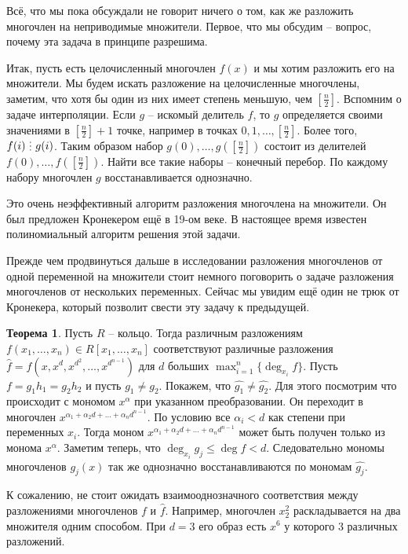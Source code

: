 \documentclass[10pt,a4paper,oneside]{book}
\theoremstyle{definition}
\newtheorem{thm}{{\color{red!40!black} Теорема}}
\newcommand{\di}{\mathop{\,\scalebox{0.85}{\raisebox{-1.2pt}[0.5\height]{\vdots}}\,}}
\def\thrm{\begin{thm}}
\def\ethrm{\end{thm}}
\begin{document}
Всё, что мы пока обсуждали не говорит ничего о том, как же разложить многочлен на неприводимые множители. Первое, что мы обсудим -- вопрос, почему эта задача в принципе разрешима.

Итак, пусть есть целочисленный многочлен $f(x)$ и мы хотим разложить его на множители. Мы будем искать разложение на целочисленные многочлены, заметим, что хотя бы один из них имеет степень меньшую, чем $[\frac{n}{2}]$. Вспомним о задаче интерполяции. Если $g$ -- искомый делитель $f$, то $g$ определяется своими значениями в $[\frac{n}{2}]+1$ точке, например в точках $0,1,\dots, [\frac{n}{2}]$. Более того, $f(i) \di g(i)$. Таким образом набор $g(0),\dots, g([\frac{n}{2}])$ состоит из делителей $f(0),\dots,f([\frac{n}{2}])$. Найти все такие наборы -- конечный перебор. По каждому набору многочлен $g$ восстанавливается однозначно.

Это очень неэффективный алгоритм разложения многочлена на множители. Он был предложен Кронекером ещё в 19-ом веке. В настоящее время известен полиномиальный алгоритм решения этой задачи. 

Прежде чем продвинуться дальше в исследовании разложения многочленов от одной переменной на множители стоит немного поговорить о задаче разложения многочленов от нескольких переменных. Сейчас мы увидим ещё один не трюк от Кронекера, который позволит свести эту задачу к предыдущей.

\thrm Пусть $R$ -- кольцо. Тогда различным разложениям $f(x_1,\dots,x_n)\in R[x_1,\dots,x_n]$   соответствуют различные разложения $\hat{f}=f(x, x^d, x^{d^2}, \dots, x^{d^{n-1}})$ для $d$ больших $\max_{i=1}^n \{\deg_{x_i} f\}$.
\proof Пусть $f=g_1h_1=g_2h_2$ и пусть $g_1\neq g_2$. Покажем, что $\hat{g_1}\neq \hat{g_2}$. Для этого посмотрим что происходит с мономом $x^{\alpha}$ при указанном преобразовании. Он переходит в многочлен $x^{\alpha_1+\alpha_2d+\dots+\alpha_n d^{n-1}}$. По условию все $\alpha_i<d$ как степени при переменных $x_i$. Тогда моном $x^{\alpha_1+\alpha_2d+\dots+\alpha_n d^{n-1}}$ может быть получен только из монома $x^{\alpha}$. Заметим теперь, что $\deg_{x_i} g_j \leq \deg f <d$. Следовательно мономы многочленов $g_j(x)$ так же однозначно восстанавливаются по мономам $\hat{g_j}$.
\endproof
\ethrm

К сожалению, не стоит ожидать взаимооднозначного соответствия между разложениями многочленов $f$ и $\hat{f}$. Например, многочлен $x_2^2$ раскладывается на два множителя одним способом. При $d=3$ его образ есть $x^6$ у которого 3 различных разложений.
\end{document}
